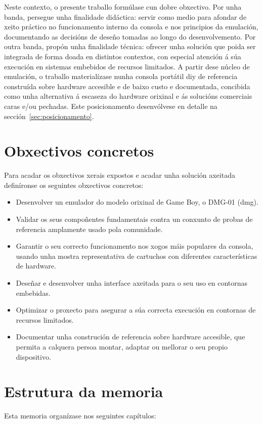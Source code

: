 Neste contexto, o presente traballo formúlase cun dobre obxectivo.
Por unha banda, persegue unha finalidade didáctica:
servir como medio para afondar de xeito práctico no funcionamento interno da consola e nos principios da emulación,
documentando as decisións de deseño tomadas ao longo do desenvolvemento.
Por outra banda, propón unha finalidade técnica: ofrecer unha solución que poida ser integrada de forma doada en distintos contextos,
con especial atención á súa execución en sistemas embebidos de recursos limitados.
A partir dese núcleo de emulación, o traballo materialízase nunha consola portátil \acrfull{diy} de referencia
construída sobre hardware accesible e de baixo custo e documentada,
concibida como unha alternativa á escaseza do hardware orixinal
e ás solucións comerciais caras e/ou pechadas.
Este posicionamento desenvólvese en detalle na sección~\ref{sec:posicionamento}.

\section{Obxectivos concretos}
\label{sec:obxectivos}

Para acadar os obxectivos xerais expostos e acadar unha solución axeitada definíronse os seguintes obxectivos concretos:

\begin{itemize}
    \item Desenvolver un emulador do modelo orixinal de Game Boy, o DMG-01 (\acrlong{dmg}).
    \item Validar os seus compoñentes fundamentais contra un conxunto de probas de referencia amplamente usado pola comunidade.
    \item Garantir o seu correcto funcionamento nos xogos máis populares da consola, usando unha mostra representativa de cartuchos con diferentes características de hardware.
    \item Deseñar e desenvolver unha interface axeitada para o seu uso en contornas embebidas.
    \item Optimizar o proxecto para asegurar a súa correcta execución en contornas de recursos limitados.
    \item Documentar unha construción de referencia sobre hardware accesible, que permita a calquera persoa montar, adaptar ou mellorar o seu propio dispositivo.
\end{itemize}

\section{Estrutura da memoria}
\label{sec:estructura}
Esta memoria organízase nos seguintes capítulos:

